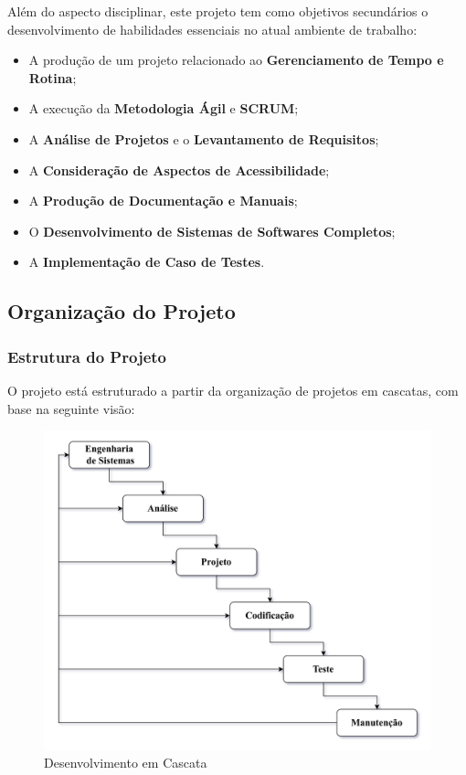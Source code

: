 \documentclass[a4paper,12pt]{article}
\begin{document}
Além do aspecto disciplinar, este projeto tem como objetivos secundários o desenvolvimento de habilidades essenciais no atual ambiente de trabalho:
\begin{itemize}
    \item A produção de um projeto relacionado ao \textbf{Gerenciamento de Tempo e Rotina};
    \item A execução da \textbf{Metodologia Ágil} e \textbf{SCRUM};
    \item A \textbf{Análise de Projetos} e o \textbf{Levantamento de Requisitos};
    \item A \textbf{Consideração de Aspectos de Acessibilidade};
    \item A \textbf{Produção de Documentação e Manuais};
    \item O \textbf{Desenvolvimento de Sistemas de Softwares Completos};
    \item A \textbf{Implementação de Caso de Testes}.
\end{itemize}

\subsection{Organização do Projeto}
\subsubsection{Estrutura do Projeto}
O projeto está estruturado a partir da organização de projetos em cascatas, com base na seguinte visão:

\vspace{1em}
\begin{figure}[H]
    \centering
    \includegraphics[scale=0.25]{waterfall.drawio.png}
    \caption{Desenvolvimento em Cascata}
\end{figure}
\end{document}
